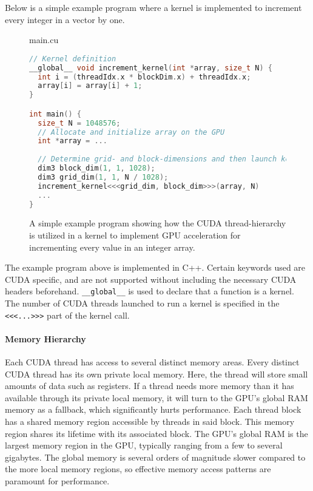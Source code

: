 Below is a simple example program where a kernel is implemented to increment every integer in a vector by one.
\begin{figure}[H]
\begin{center}
main.cu
\end{center}
\begin{lstlisting}[language=C++,style=cppcode]
// Kernel definition
__global__ void increment_kernel(int *array, size_t N) {
  int i = (threadIdx.x * blockDim.x) + threadIdx.x;
  array[i] = array[i] + 1;
}

int main() {
  size_t N = 1048576;
  // Allocate and initialize array on the GPU
  int *array = ...
  
  // Determine grid- and block-dimensions and then launch kernels
  dim3 block_dim(1, 1, 1028);
  dim3 grid_dim(1, 1, N / 1028);
  increment_kernel<<<grid_dim, block_dim>>>(array, N)
  ...
}
\end{lstlisting}
\caption{
  A simple example program showing how the CUDA thread-hierarchy is utilized in a kernel to implement GPU acceleration for incrementing every value in an integer array.
}
\label{background:graphical_processing_units:cuda:example_code}
\end{figure}

\lstset{language=C++,style=cppcode}

The example program above is implemented in C++.
Certain keywords used are CUDA specific, and are not supported without including the necessary CUDA headers beforehand.
\lstinline{__global__} is used to declare that a function is a kernel.
The number of CUDA threads launched to run a kernel is specified in the \lstinline{<<<...>>>} part of the kernel call.

\paragraph{Memory Hierarchy}
Each CUDA thread has access to several distinct memory areas.
Every distinct CUDA thread has its own private local memory.
Here, the thread will store small amounts of data such as registers.
If a thread needs more memory than it has available through its private local memory, it will turn to the GPU's global RAM memory as a fallback, which significantly hurts performance.
Each thread block has a shared memory region accessible by threads in said block.
This memory region shares its lifetime with its associated block.
The GPU's global RAM is the largest memory region in the GPU, typically ranging from a few to several gigabytes.
The global memory is several orders of magnitude slower compared to the more local memory regions, so effective memory access patterns are paramount for performance.

